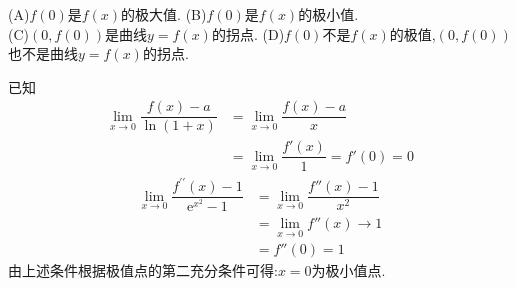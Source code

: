 \documentclass[8pt a4paper, oneside, UTF8]{ctexbook}  %
\begin{document}
\begin{sloppypar}
\begin{problem}
    (A)$f(0)$是$f(x)$的极大值.\quad
    (B)$f(0)$是$f(x)$的极小值.\\
    (C)$(0,f(0))$是曲线$y=f(x)$的拐点.\quad
    (D)$f(0)$不是$f(x)$的极值,$(0,f(0))$也不是曲线$y=f(x)$的拐点.
    \end{problem}
    \begin{solution}
        已知
        \begin{align*}
            \operatorname*{lim}_{x\to0}\dfrac{f(x)-a}{\operatorname{ln}(1+x)} & = \lim_{x\to 0}\dfrac{f(x)-a}{x}        \\
                                                                              & = \lim_{x\to 0}\dfrac{f'(x)}{1}=f'(0)=0
        \end{align*}
        \begin{align*}
            \operatorname*{lim}_{x\to0}\dfrac{f^{\prime\prime}(x)-1}{\mathrm{e}^{x^{2}}-1} & =  \lim_{x\to 0}\dfrac{f''(x)-1}{x^2} \\
                                                                                           & = \lim_{x\to 0} f''(x) \to 1          \\
                                                                                           & =f''(0)=1
        \end{align*}
        由上述条件根据极值点的第二充分条件可得:$x=0$为极小值点.
    \end{solution}

\end{sloppypar}
\end{document}
